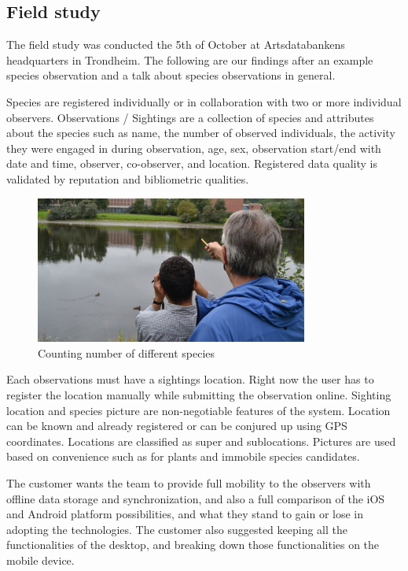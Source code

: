 \subsection{Field study}
\label{sec:field-study}
The field study was conducted the 5th of October at Artsdatabankens headquarters
in Trondheim. The following are our findings after an example species
observation and a talk about species observations in general.

Species are registered individually or in collaboration with two or
more individual observers. Observations / Sightings are a collection of species
and attributes about the species such as name, the number of observed
individuals, the activity they were engaged in during observation, age, sex,
observation start/end with date and time, observer, co-observer, and location.
Registered data quality is validated by reputation and bibliometric qualities.

\begin{figure}[htb]
	\centering
	\includegraphics[width=0.8\textwidth]{prestudy/field_study/field_stud.jpg}
	\caption{Counting number of different species}
	\label{fig:field_study}
\end{figure}

Each observations must have a sightings location. Right now the user has to
register the location manually while submitting the observation online.
Sighting location and species picture are non-negotiable features of the system.
Location can be known and already registered or can be conjured up using GPS
coordinates. Locations are classified as super and sublocations. Pictures are
used based on convenience such as for plants and immobile species candidates.

The customer wants the team to provide full mobility to the observers with
offline data storage and synchronization, and also a full comparison of the iOS
and Android platform possibilities, and what they stand to gain or lose in
adopting the technologies. The customer also suggested keeping all the
functionalities of the desktop, and breaking down those functionalities on the
mobile device.


